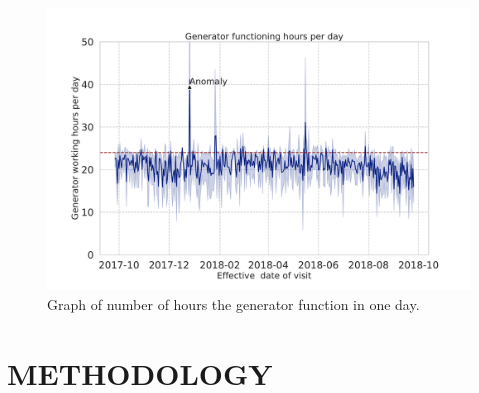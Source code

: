\documentclass[a4paper,fleqn]{cas-dc}
\begin{document}
\begin{figure}
	\begin{minipage}[H]{\linewidth}
	\centering
	\includegraphics[width=1.0\linewidth]{"Figures/Generator"}
\end{minipage}
	\caption{Graph of number of hours the generator function in one day.}
	\label{fig:rr}
\end{figure}

\section{METHODOLOGY} \label{sec:med}
\end{document}
